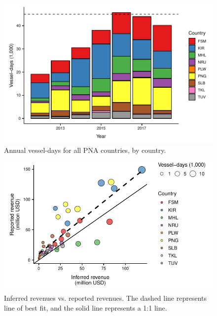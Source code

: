 \documentclass[9p,twocolumn,twoside,lineno]{pnas-new}
\begin{document}
\begin{figure}[H]
\centering
	\includegraphics{img/all_PS_VDS_cty_year.pdf}
	\caption{\label{fig:all_PS_VDS_cty_year}Annual vessel-days for all PNA countries, by country.}
\end{figure}

\begin{figure}[H]
\centering
	\includegraphics{img/revenue_FFA_GFW_linear.pdf}
	\caption{\label{fig:revenue_FFA_GFW_linear}Inferred revenues vs. reported revenues. The dashed line represents line of best fit, and the solid line represents a 1:1 line.}
\end{figure}
\end{document}
